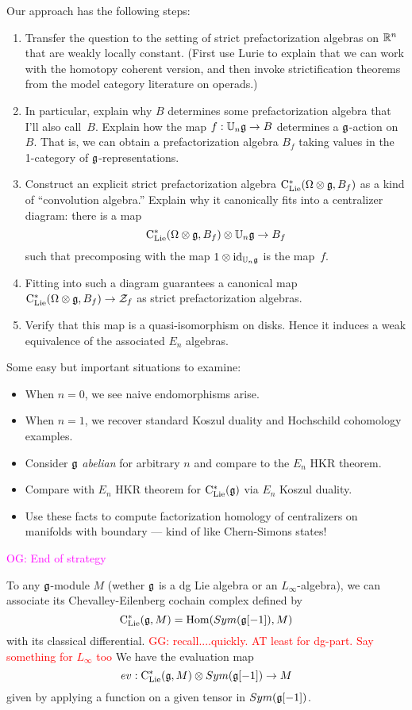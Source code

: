 \documentclass[11pt]{amsart}
\numberwithin{equation}{section}
\def\owen{\textcolor{magenta}{OG: }\textcolor{magenta}}
\def\greg{\textcolor{red}{GG: }\textcolor{red}}
\begin{document}
Our approach has the following steps:
\begin{enumerate}
\item Transfer the question to the setting of strict prefactorization algebras on $\mathbb R^n$ that are weakly locally constant. (First use Lurie to explain that we can work with the homotopy coherent version, and then invoke strictification theorems from the model category literature on operads.) 
\item In particular, explain why $B$ determines some prefactorization algebra that I'll also call~$B$. Explain how the map $f: \mathbb U_n \mathfrak g \to B$ determines a $\mathfrak g$-action on $B$. That is, we can obtain a prefactorization algebra $B_f$ taking values in the 1-category of $\mathfrak g$-representations.
\item Construct an explicit strict prefactorization algebra ${\rm C}_{\rm Lie}^*(\Omega \otimes \mathfrak g, B_f)$ as a kind of ``convolution algebra.'' Explain why it canonically fits into a centralizer diagram: there is a map
\[
{\rm C}_{\rm Lie}^*(\Omega \otimes \mathfrak g, B_f) \otimes \mathbb U_n \mathfrak g \to B_f
\]
such that precomposing with the map $1 \otimes {\rm id}_{\mathbb U_n \mathfrak g}$ is the map~$f$.
\item Fitting into such a diagram guarantees a canonical map ${\rm C}_{\rm Lie}^*(\Omega \otimes \mathfrak g, B_f) \to \mathcal Z_f$ as strict prefactorization algebras.
\item Verify that this map is a quasi-isomorphism on disks. 
Hence it induces a weak equivalence of the associated $E_n$ algebras. 
\end{enumerate}

Some easy but important situations to examine:
\begin{itemize}
\item When $n=0$, we see naive endomorphisms arise.
\item When $n=1$, we recover standard Koszul duality and Hochschild cohomology examples.
\item Consider $\mathfrak g$ {\em abelian} for arbitrary $n$ and compare to the $E_n$ HKR theorem.
\item Compare with $E_n$ HKR theorem for ${\rm C}_{\rm Lie}^*(\mathfrak g)$ via $E_n$ Koszul duality.
\item Use these facts to compute factorization homology of centralizers on manifolds with boundary --- kind of like Chern-Simons states!
\end{itemize}

\owen{End of strategy}

To any $\mathfrak g$-module $M$ (wether $\mathfrak g$ is a dg Lie algebra or an $L_\infty$-algebra), 
we can associate its Chevalley-Eilenberg cochain complex defined 
by 
\begin{equation}
 {\rm C}_{\rm Lie}^*(\mathfrak g, M) = {\rm Hom} (Sym(\mathfrak g[-1]), M)
\end{equation}
with its classical differential. 
\greg{recall....quickly. AT least for dg-part. Say something for $L_\infty$ too}
We have the evaluation map 
\begin{equation}
 \label{eq:defev} ev: {\rm C}_{\rm Lie}^*(\mathfrak g, M) \otimes Sym(\mathfrak g[-1])\to M
\end{equation}
given by applying a function on a given tensor in $Sym(\mathfrak g[-1])$.
\end{document}

